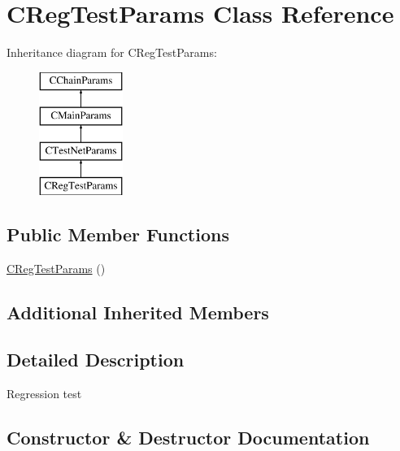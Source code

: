 \hypertarget{class_c_reg_test_params}{}\section{C\+Reg\+Test\+Params Class Reference}
\label{class_c_reg_test_params}
Inheritance diagram for C\+Reg\+Test\+Params\+:\begin{figure}[H]
\begin{center}
\leavevmode
\includegraphics[height=4.000000cm]{class_c_reg_test_params}
\end{center}
\end{figure}
\subsection*{Public Member Functions}
\begin{DoxyCompactItemize}
\item 
\mbox{\hyperlink{class_c_reg_test_params_aceca5a50765323f150ac608ca43db4fd}{C\+Reg\+Test\+Params}} ()
\end{DoxyCompactItemize}
\subsection*{Additional Inherited Members}


\subsection{Detailed Description}
Regression test 

\subsection{Constructor \& Destructor Documentation}
\mbox{\label{class_c_reg_test_params_aceca5a50765323f150ac608ca43db4fd}} 
